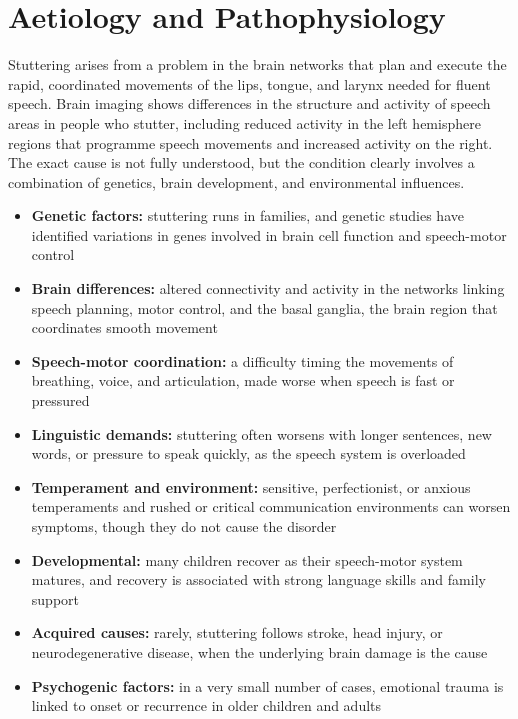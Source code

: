 \section*{Aetiology and Pathophysiology}
Stuttering arises from a problem in the brain networks that plan and execute the rapid, coordinated movements of the lips, tongue, and larynx needed for fluent speech. Brain imaging shows differences in the structure and activity of speech areas in people who stutter, including reduced activity in the left hemisphere regions that programme speech movements and increased activity on the right. The exact cause is not fully understood, but the condition clearly involves a combination of genetics, brain development, and environmental influences.

\begin{itemize}
    \item \textbf{Genetic factors:} stuttering runs in families, and genetic studies have identified variations in genes involved in brain cell function and speech-motor control
    \item \textbf{Brain differences:} altered connectivity and activity in the networks linking speech planning, motor control, and the basal ganglia, the brain region that coordinates smooth movement
    \item \textbf{Speech-motor coordination:} a difficulty timing the movements of breathing, voice, and articulation, made worse when speech is fast or pressured
    \item \textbf{Linguistic demands:} stuttering often worsens with longer sentences, new words, or pressure to speak quickly, as the speech system is overloaded
    \item \textbf{Temperament and environment:} sensitive, perfectionist, or anxious temperaments and rushed or critical communication environments can worsen symptoms, though they do not cause the disorder
    \item \textbf{Developmental:} many children recover as their speech-motor system matures, and recovery is associated with strong language skills and family support
    \item \textbf{Acquired causes:} rarely, stuttering follows stroke, head injury, or neurodegenerative disease, when the underlying brain damage is the cause
    \item \textbf{Psychogenic factors:} in a very small number of cases, emotional trauma is linked to onset or recurrence in older children and adults
\end{itemize}

